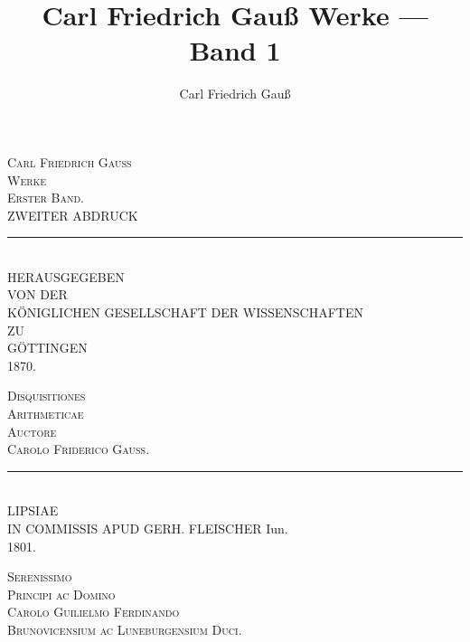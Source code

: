\documentclass[12pt,a4paper]{article}
\title{Carl Friedrich Gauß Werke --- Band 1}
\author{Carl Friedrich Gauß}
\date{}
\theoremstyle{plain}
\theoremstyle{definition}
\theoremstyle{remark}
\begin{document}
\thispagestyle{empty}
\begin{center}
\vspace*{3cm}
{\Huge\scshape Carl Friedrich Gauß\\[0.5em] Werke}\\[2em]
{\LARGE\scshape Erster Band.}\\[1em]
{\large ZWEITER ABDRUCK}\\[2em]
\rule{0.5\textwidth}{0.4pt}\\[2em]
{\large HERAUSGEGEBEN\\[0.3em]
VON DER\\[0.3em]
KÖNIGLICHEN GESELLSCHAFT DER WISSENSCHAFTEN\\[0.5em]
ZU}\\[1em]
{\Large GÖTTINGEN}\\[2em]
{1870.}
\end{center}
\clearpage

\thispagestyle{empty}
\begin{center}
\vspace*{2cm}
{\Huge\scshape Disquisitiones\\[0.5em] Arithmeticae}\\[2em]
{\large\scshape Auctore\\[0.5em]
Carolo Friderico Gauss.}\\[3em]
\rule{0.4\textwidth}{0.4pt}\\[2em]
{\large LIPSIAE\\[0.3em]
IN COMMISSIS APUD GERH. FLEISCHER Iun.}\\[1em]
{1801.}
\end{center}
\clearpage

\thispagestyle{empty}
\begin{center}
{\large\scshape Serenissimo\\[0.3em]
Principi ac Domino\\[0.3em]
Carolo Guilielmo Ferdinando\\[0.3em]
Brunovicensium ac Luneburgensium Duci.}
\end{center}
\vspace{1em}
\end{document}
